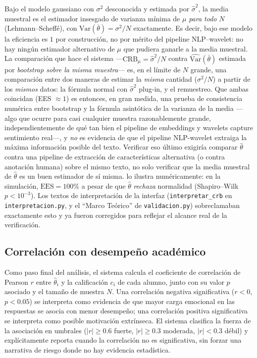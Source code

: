 \documentclass[11pt,a4paper,oneside]{article}
\theoremstyle{definition}
\begin{document}
\begin{warningBox}[title=Hueco: qué NO certifica esta verificación]
Bajo el modelo gaussiano con $\sigma^2$ desconocida y estimada por $\hat\sigma^2$, la media
muestral es el estimador insesgado de varianza mínima de $\mu$ \emph{para todo} $N$
(Lehmann--Scheffé), con $\mathrm{Var}(\bar\theta)=\sigma^2/N$ exactamente. Es decir, bajo ese
modelo la eficiencia es $1$ por construcción, no por mérito del pipeline NLP--wavelet: no hay
ningún estimador alternativo de $\mu$ que pudiera ganarle a la media muestral. La comparación que
hace el sistema —$\mathrm{CRB}_\mu=\hat\sigma^2/N$ contra $\widehat{\mathrm{Var}}(\bar\theta)$
estimada por \emph{bootstrap sobre la misma muestra}— es, en el límite de $N$ grande, una
comparación entre dos maneras de estimar la \emph{misma} cantidad ($\sigma^2/N$) a partir de los
\emph{mismos} datos: la fórmula normal con $\hat\sigma^2$ plug-in, y el remuestreo. Que ambas
coincidan (EES $\approx 1$) es entonces, en gran medida, una prueba de consistencia numérica
entre bootstrap y la fórmula asintótica de la varianza de la media —algo que ocurre para casi
cualquier muestra razonablemente grande, independientemente de qué tan bien el pipeline de
embeddings y wavelets capture sentimiento real—, y \emph{no} es evidencia de que el pipeline
NLP-wavelet extraiga la máxima información posible del texto. Verificar eso último exigiría
comparar $\hat\theta$ contra una pipeline de extracción de características alternativa (o contra
anotación humana) sobre el mismo texto, no solo verificar que la media muestral de $\hat\theta$
es un buen estimador de sí misma.  lo ilustra numéricamente: en la
simulación, $\mathrm{EES}=100\%$ a pesar de que $\hat\theta$ \emph{rechaza} normalidad
(Shapiro--Wilk $p<10^{-3}$). Los textos de interpretación de la interfaz
(\texttt{interpretar\_crb} en \texttt{interpretacion.py}, y el ``Marco Teórico'' de
\texttt{validacion.py}) sobreclamaban exactamente esto y ya fueron corregidos para reflejar el
alcance real de la verificación.
\end{warningBox}

\subsection{Correlación con desempeño académico}

Como paso final del análisis, el sistema calcula el coeficiente de correlación de Pearson $r$
\cite{Pearson1896} entre $\hat\theta_i$ y la calificación $c_i$ de cada alumno, junto con su
valor $p$ asociado y el tamaño de muestra $N$. Una correlación negativa significativa ($r<0$,
$p<0.05$) se interpreta como evidencia de que mayor carga emocional en las respuestas se asocia
con menor desempeño; una correlación positiva significativa se interpreta como posible
motivación extrínseca. El sistema clasifica la fuerza de la asociación en umbrales ($|r|\ge 0.6$
fuerte, $|r|\ge 0.3$ moderada, $|r|<0.3$ débil) y explícitamente reporta cuando la correlación no
es significativa, sin forzar una narrativa de riesgo donde no hay evidencia estadística.
\end{document}
